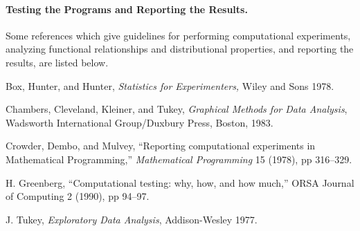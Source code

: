 \paragraph{Testing the Programs and Reporting the Results.} 

Some references which give guidelines for performing computational
experiments, analyzing functional relationships and distributional
properties, and reporting the results, are listed below.
\begin{description}

\item Box, Hunter, and Hunter, {\em Statistics for Experimenters,} 
Wiley and Sons 1978.

\item Chambers, Cleveland, Kleiner, and Tukey, {\em Graphical Methods
for Data Analysis}, Wadsworth International Group/Duxbury Press,
Boston, 1983.

\item Crowder, Dembo, and Mulvey, ``Reporting computational experiments
in Mathematical Programming,'' {\em Mathematical Programming} 15
(1978), pp 316--329.

\item H. Greenberg, ``Computational testing: why, how, and how much,''
ORSA Journal of Computing 2 (1990), pp 94--97.

\item J. Tukey, {\em Exploratory Data Analysis}, Addison-Wesley 1977. 

\end{description} 

